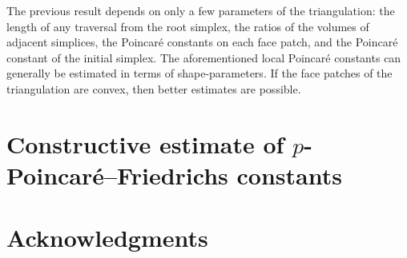 \documentclass[a4paper]{amsart}
\begin{document}
\begin{remark}
    The previous result depends on only a few parameters of the triangulation:
    the length of any traversal from the root simplex,
    the ratios of the volumes of adjacent simplices,
    the Poincar\'e constants on each face patch, and the Poincar\'e constant of the initial simplex. 
    The aforementioned local Poincar\'e constants can generally be estimated in terms of shape-parameters. 
    If the face patches of the triangulation are convex, then better estimates are possible. 
\end{remark}



\section{Constructive estimate of $p$-Poincar\'e--Friedrichs constants}

\section*{Acknowledgments}



\end{document}
